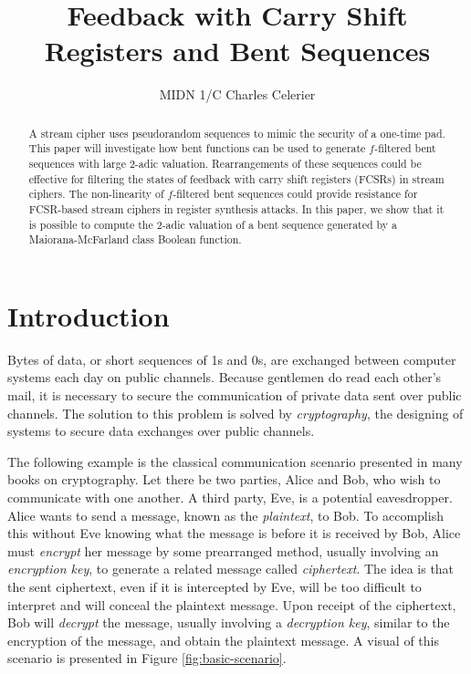 \documentclass[english]{article}
\theoremstyle{plain}
\theoremstyle{definition}
\theoremstyle{remark}
\begin{document}
\title{Feedback with Carry Shift Registers and Bent Sequences}
\author{MIDN 1/C Charles Celerier}

\maketitle

\begin{abstract}
  A stream cipher uses pseudorandom sequences to mimic the security of a
  one-time pad. This paper will investigate how bent functions can be used
  to generate $f$-filtered bent sequences with large 2-adic valuation.
  Rearrangements of these sequences could be effective for filtering the states
  of feedback with carry shift registers (FCSRs) in stream ciphers. The
  non-linearity of $f$-filtered bent sequences could provide resistance
  for FCSR-based stream ciphers in register synthesis attacks. In this paper, we
  show that it is possible to compute the 2-adic valuation of a bent
  sequence generated by a Maiorana-McFarland class Boolean function.
\end{abstract}


\section{Introduction}\label{sec:intro}
\par Bytes of data, or short sequences of 1s and 0s, are exchanged between
computer systems each day on public channels. Because gentlemen do read each
other's mail, it is necessary to secure the communication of private data
sent over public channels. The solution to this problem is solved by
{\em cryptography}, the designing of systems to secure data exchanges over
public channels.

\par The following example is the classical communication scenario presented
in many books on cryptography. Let there be two parties, Alice and Bob, who
wish to communicate with one another. A third party, Eve, is a potential
eavesdropper. Alice wants to send a message, known as the {\em plaintext},
to Bob. To accomplish this without Eve knowing what the message is before it
is received by Bob, Alice must {\em encrypt} her message by some prearranged
method, usually involving an {\em encryption key}, to generate a related
message called {\em ciphertext}. The idea is that the sent ciphertext, even
if it is intercepted by Eve, will be too difficult to interpret and will
conceal the plaintext message. Upon receipt of the ciphertext, Bob will
{\em decrypt} the message, usually involving a {\em decryption key}, similar
to the encryption of the message, and obtain the plaintext message. A visual
of this scenario is presented in Figure \ref{fig:basic-scenario}.
\end{document}
